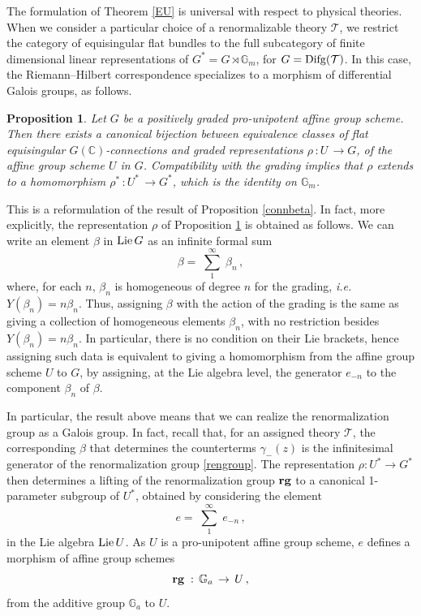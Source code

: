 \documentclass[10pt]{amsart}
\def\C{{\mathbb C}}
\newcommand{\bG}{\mathbb{G}}
\def\sT{{\mathcal T}}
\def\Lie{{\rm Lie}}
\newcommand{\ie}{{\it i.e.\/}\ }
\newtheorem{prop}[thm]{Proposition}
\numberwithin{equation}{section}
\begin{document}
The formulation of Theorem \ref{EU} is universal with respect to
physical theories. When we consider a particular choice of a
renormalizable theory $\sT$, we restrict the category of
equisingular flat bundles to the full subcategory of finite
dimensional linear representations of $G^*=G\rtimes \bG_m$, for
$G={\rm Difg}(\sT)$. In this case, the Riemann--Hilbert
correspondence specializes to a morphism of differential Galois
groups, as follows.

\begin{prop} \label{rhoG}
Let $G$ be a positively graded pro-unipotent affine group scheme.
Then there exists a canonical bijection between equivalence
classes of flat equisingular $G(\C)$-connections and graded
representations $\rho \, : U\,\to G$, of the affine group scheme
$U$ in $G$. Compatibility with the grading implies that $\rho$
extends to a homomorphism $\rho^* \, : U^*\,\to G^*$, which is the
identity on $\bG_m$.
\end{prop}

\smallskip

This is a reformulation of the result of Proposition
\ref{connbeta}. In fact, more explicitly, the representation
$\rho$ of Proposition \ref{rhoG} is obtained as follows. We can
write an element $\beta$ in $\Lie\,G$ as an infinite formal sum
\begin{equation}\label{betasum}
\beta=\; \sum_1^\infty\;\beta_n\,,
\end{equation}
where, for each $n$, $\beta_n$ is homogeneous of degree $n$ for
the grading, \ie $Y(\beta_n)=n \beta_n$. Thus, assigning $\beta$
with the action of the grading is the same as giving a collection
of homogeneous elements $\beta_n$, with no restriction besides
$Y(\beta_n)=n \beta_n$. In particular, there is no condition on
their Lie brackets, hence assigning such data is equivalent to
giving a homomorphism from the affine group scheme $U$ to $G$, by
assigning, at the Lie algebra level, the generator $e_{-n}$ to the
component $\beta_n$ of $\beta$.

\smallskip

In particular, the result above means that we can realize the
renormalization group as a Galois group. In fact, recall that, for
an assigned theory $\sT$, the corresponding $\beta$ that
determines the counterterms $\gamma_{-}(z)$ is the infinitesimal
generator of the renormalization group \eqref{rengroup}. The
representation $\rho: U^* \to G^*$ then determines a lifting of
the renormalization group ${\bf rg}$ to a canonical 1-parameter
subgroup of $U^*$, obtained by considering the element
\begin{equation}\label{esum}
e=\; \sum_1^\infty\;e_{-n}\,,
\end{equation}
in the Lie algebra $\Lie\,U$. As $U$ is a pro-unipotent affine
group scheme, $e$ defines a morphism of affine group schemes
\begin{equation}\label{rgU}
{\bf{rg}}\; :\,\bG_a \,\to \,U\,,
\end{equation}
from the additive group $\bG_a$ to $U$.
\end{document}
